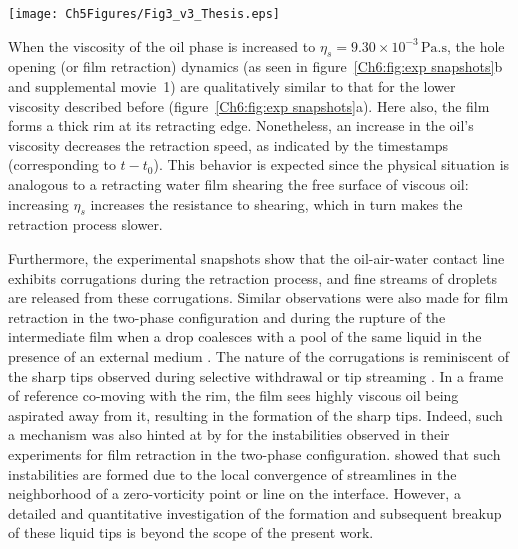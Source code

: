 \begin{sidewaysfigure}
	\centering
	\texttt{[image: Ch5Figures/Fig3\_v3\_Thesis.eps]}
	\caption{Time-lapsed snapshots of the post-rupture retraction of water films for different oil viscosities: (a) $\nu_{s}$ = 0.65 cSt, (b) $\nu_{s}$ = 10 cSt, and (c) $\nu_{s}$ = 100 cSt. The rupture location is denoted by the white arrows, while the time stamps indicate the time since rupture is first observed (i.e., $t - t_{0}$). Also see supplemental movie~{\color{Myfig}1}.}
	\label{Ch6:fig:exp snapshots}
\end{sidewaysfigure}

When the viscosity of the oil phase is increased to $\eta_{s} = 9.30 \times 10^{-3}\,\si{\pascal}.\si{\second}$, the hole opening (or film retraction) dynamics (as seen in figure~\ref{Ch6:fig:exp snapshots}b and supplemental movie~{\color{Myfig}1}) are qualitatively similar to that for the lower viscosity described before (figure~\ref{Ch6:fig:exp snapshots}a). Here also, the film forms a thick rim at its retracting edge. Nonetheless, an increase in the oil's viscosity decreases the retraction speed, as indicated by the timestamps (corresponding to $t - t_{0}$). This behavior is expected since the physical situation is analogous to a retracting water film shearing the free surface of viscous oil: increasing $\eta_{s}$ increases the resistance to shearing, which in turn makes the retraction process slower. 

Furthermore, the experimental snapshots show that the oil-air-water contact line exhibits corrugations during the retraction process, and fine streams of droplets are released from these corrugations. Similar observations were also made for film retraction in the two-phase configuration \citep{reyssat-2006-epl, oldenziel-2012-pof} and during the rupture of the intermediate film when a drop coalesces with a pool of the same liquid in the presence of an external medium \citep{aryafar-2008-pre, kavehpour-2015-arfm}. The nature of the corrugations is reminiscent of the sharp tips observed during selective withdrawal \citep{cohen-2002-prl, courrechdupont-2006-prl, courrechdupont-2020-pnas} or tip streaming \citep{montanero-2020-rpp}. In a frame of reference co-moving with the rim, the film sees highly viscous oil being aspirated away from it, resulting in the formation of the sharp tips. Indeed, such a mechanism was also hinted at by \citet{reyssat-2006-epl} for the instabilities observed in their experiments for film retraction in the two-phase configuration. \citet{tseng-2015-jfm} showed that such instabilities are formed due to the local convergence of streamlines in the neighborhood of a zero-vorticity point or line on the interface. However, a detailed and quantitative investigation of the formation and subsequent breakup of these liquid tips is beyond the scope of the present work. 

